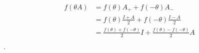 \begin{align} f(\theta A)&=f(\theta)A_{+}+f(-\theta)A_{-} \\ &=f(\theta)\frac{I+A}{2}+f(-\theta)\frac{I-A}{2}\\ &=\frac{f(\theta)+f(-\theta)}{2}I+\frac{f(\theta)-f(-\theta)}{2}A\\ \end{align} .
